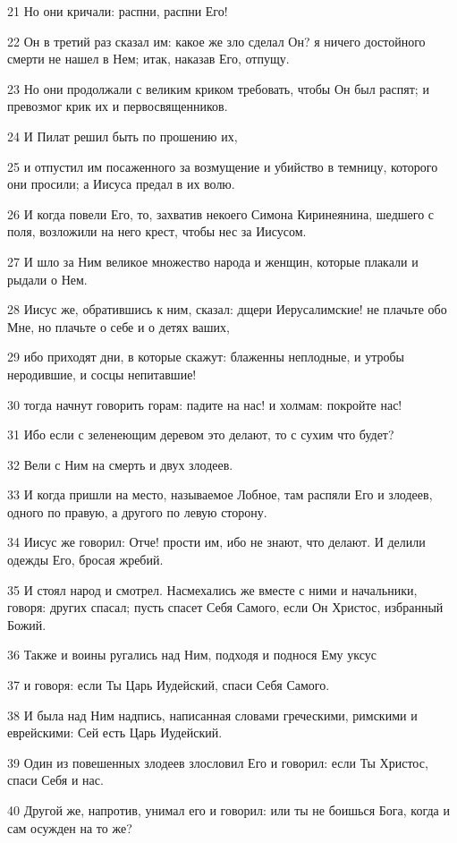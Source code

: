 \par 21 Но они кричали: распни, распни Его!
\par 22 Он в третий раз сказал им: какое же зло сделал Он? я ничего достойного смерти не нашел в Нем; итак, наказав Его, отпущу.
\par 23 Но они продолжали с великим криком требовать, чтобы Он был распят; и превозмог крик их и первосвященников.
\par 24 И Пилат решил быть по прошению их,
\par 25 и отпустил им посаженного за возмущение и убийство в темницу, которого они просили; а Иисуса предал в их волю.
\par 26 И когда повели Его, то, захватив некоего Симона Киринеянина, шедшего с поля, возложили на него крест, чтобы нес за Иисусом.
\par 27 И шло за Ним великое множество народа и женщин, которые плакали и рыдали о Нем.
\par 28 Иисус же, обратившись к ним, сказал: дщери Иерусалимские! не плачьте обо Мне, но плачьте о себе и о детях ваших,
\par 29 ибо приходят дни, в которые скажут: блаженны неплодные, и утробы неродившие, и сосцы непитавшие!
\par 30 тогда начнут говорить горам: падите на нас! и холмам: покройте нас!
\par 31 Ибо если с зеленеющим деревом это делают, то с сухим что будет?
\par 32 Вели с Ним на смерть и двух злодеев.
\par 33 И когда пришли на место, называемое Лобное, там распяли Его и злодеев, одного по правую, а другого по левую сторону.
\par 34 Иисус же говорил: Отче! прости им, ибо не знают, что делают. И делили одежды Его, бросая жребий.
\par 35 И стоял народ и смотрел. Насмехались же вместе с ними и начальники, говоря: других спасал; пусть спасет Себя Самого, если Он Христос, избранный Божий.
\par 36 Также и воины ругались над Ним, подходя и поднося Ему уксус
\par 37 и говоря: если Ты Царь Иудейский, спаси Себя Самого.
\par 38 И была над Ним надпись, написанная словами греческими, римскими и еврейскими: Сей есть Царь Иудейский.
\par 39 Один из повешенных злодеев злословил Его и говорил: если Ты Христос, спаси Себя и нас.
\par 40 Другой же, напротив, унимал его и говорил: или ты не боишься Бога, когда и сам осужден на то же?
